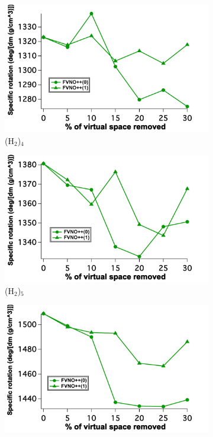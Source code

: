 \begin{figure}
\begin{subfigure}{.5\textwidth}
  \centering
  \includegraphics[width=.9\linewidth]{figures_fvno++/fvno++_cc2_1_h2_4_adz_optrot_lg.pdf}
  \caption{(H$_2$)$_4$}
  \label{fig:sfig1}
\end{subfigure}%
\begin{subfigure}{.5\textwidth}
  \centering
  \includegraphics[width=.9\linewidth]{figures_fvno++/fvno++_cc2_1_h2_5_adz_optrot_lg.pdf}
  \caption{(H$_2$)$_5$}
  \label{fig:sfig2}
\end{subfigure}
\begin{subfigure}{.5\textwidth}
  \centering
  \includegraphics[width=.9\linewidth]{figures_fvno++/fvno++_cc2_1_h2_6_adz_optrot_lg.pdf}

\end{subfigure}
\end{figure}
